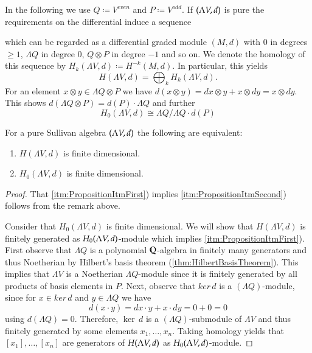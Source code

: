 In the following we use $ Q \coloneqq V^{even}$ and $P \coloneqq V^{odd}$.
If $(\Lambda V,d)$ is pure the requirements on the differential induce a sequence

\centerline{
}

which can be regarded as a differential graded module $(M,d)$ with $0$ in degrees $\geq 1$, $\Lambda Q$ in degree $0$,
$Q \otimes P$ in degree $-1$ and so on.
We denote the homology of this sequence by $H_k(\Lambda V,d) \coloneqq H^{-k}(M,d)$. In particular, this yields
$$ H(\Lambda V,d) = \bigoplus_k H_k(\Lambda V,d).$$
For an element $x \otimes y \in \Lambda Q \otimes P$ we have 
$ d( x \otimes y) = dx \otimes y + x \otimes dy = x \otimes dy$. This shows
$d( \Lambda Q \otimes P) = d(P) \cdot \Lambda Q$ and further
$$H_0(\Lambda V, d) \cong \Lambda Q / \Lambda Q \cdot d(P)$$

\begin{Proposition}
\label{prop:FiniteDimensionDependentOnDegreeOne}

 For a pure Sullivan algebra $(\Lambda V,d)$ the following are equivalent:
 
 \begin{enumerate}
  \item  \label{itm:PropositionItmFirst} $H(\Lambda V,d)$ is finite dimensional.
  \item \label{itm:PropositionItmSecond}$H_0(\Lambda V,d)$ is finite dimensional.
 \end{enumerate}

\end{Proposition}

\begin{proof}
 That \ref{itm:PropositionItmFirst}) implies \ref{itm:PropositionItmSecond}) follows
 from the remark above. \par Consider that $H_0(\Lambda V,d)$ is finite dimensional.
 We will show that $H(\Lambda V, d)$ is finitely generated as $H_0 (\Lambda V,d)$-module which implies \ref{itm:PropositionItmFirst}).
 First observe that $\Lambda Q$ is a polynomial $\mathbb{Q}$-algebra in finitely many generators and thus Noetherian by
 Hilbert's basis theorem (\ref{thm:HilbertBasisTheorem}). This implies that $\Lambda V$ is a Noetherian $\Lambda Q$-module since it is 
 finitely generated by all products of basis elements in $ P$. Next, observe that
 $ker \, d$ is a $(\Lambda Q)$-module, since for $x \in ker \, d$ and  $y \in \Lambda Q$ we have
 $$ d(x \cdot y) = dx \cdot y + x \cdot dy = 0 + 0 = 0$$
 using $d(\Lambda Q) = 0$. Therefore, $\ker \, d$ is a $(\Lambda Q)$-submodule of $\Lambda V$ and thus 
 finitely generated by some elements $x_1, \ldots, x_n$. Taking homology yields that $[x_1], \ldots, [x_n]$
 are generators of $H (\Lambda V,d)$ as $H_0 (\Lambda V,d)$-module.
\end{proof}

